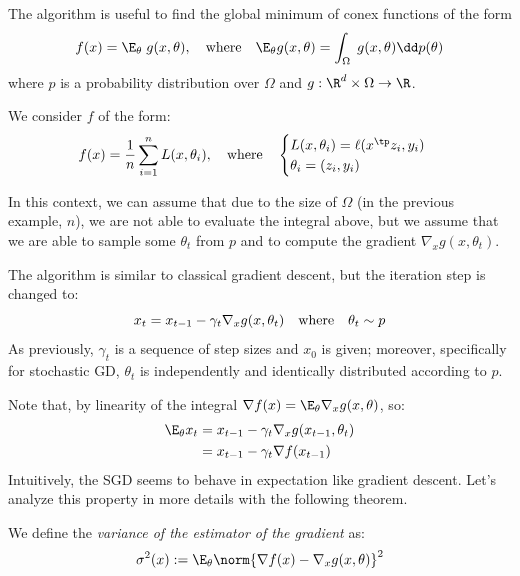 \documentclass{../cs-classes/cs-classes}
\begin{document}
The algorithm is useful to find the global minimum of conex functions of the form
\begin{equation*}
    f(x)=\E_\theta\;g(x, \theta), \quad\textnormal{where}\quad \E_\theta g(x, \theta)=\int_\Omega\;g(x,\theta)\dd p(\theta)
\end{equation*}
where $p$ is a probability distribution over $\Omega$ and $g:\R^d\times\Omega\to\R$.

\begin{example}
    We consider $f$ of the form:
    \begin{equation*}
        f(x) = \frac{1}{n}\sum_{i=1}^n L(x, \theta_i), \quad\textnormal{where}\quad \begin{cases}
            L(x, \theta_i)=\ell(x^\tp z_i, y_i)\\
            \theta_i=(z_i, y_i)
        \end{cases}
    \end{equation*}
\end{example}
In this context, we can assume that due to the size of $\Omega$ (in the previous example, $n$), we are not able to evaluate the integral above, but we assume that we are able to sample some $\theta_t$ from $p$ and to compute the gradient $\nabla_x g(x, \theta_t)$.

The algorithm is similar to classical gradient descent, but the iteration step is changed to:
\begin{equation*}
    x_t=x_{t-1}-\gamma_t\nabla_x g(x, \theta_t) \quad\textnormal{where}\quad \theta_t\sim p
\end{equation*}
As previously, $\gamma_t$ is a sequence of step sizes and $x_0$ is given; moreover, specifically for stochastic GD, $\theta_t$ is independently and identically distributed according to $p$. 

Note that, by linearity of the integral $\nabla f(x)=\E_\theta \nabla_x g(x,\theta)$, so:
\begin{equation*}
    \begin{aligned}
        \E_\theta x_t &= x_{t-1}-\gamma_t\nabla_xg(x_{t-1},\theta_t)\\
        &=x_{t-1} - \gamma_t\nabla f(x_{t-1})
    \end{aligned}
\end{equation*}
Intuitively, the SGD seems to behave in expectation like gradient descent. Let's analyze this property in more details with the following theorem.

\begin{definition}
    We define the \emph{variance of the estimator of the gradient} as:
    \begin{equation*}
        \sigma^2(x):=\E_\theta\norm{\nabla f(x)-\nabla_x g(x,\theta)}^2
    \end{equation*}
\end{definition}
\end{document}
